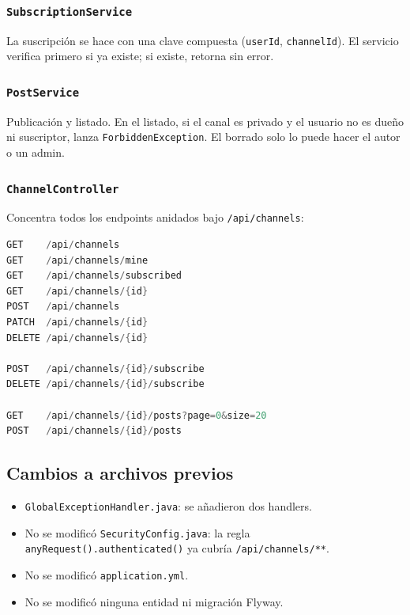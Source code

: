 \subsubsection{\texttt{SubscriptionService}}

La suscripción se hace con una clave compuesta (\texttt{userId}, \texttt{channelId}). El servicio verifica primero si ya existe; si existe, retorna sin error.

\subsubsection{\texttt{PostService}}

Publicación y listado. En el listado, si el canal es privado y el usuario no es dueño ni suscriptor, lanza \texttt{ForbiddenException}. El borrado solo lo puede hacer el autor o un admin.

\subsubsection{\texttt{ChannelController}}

Concentra todos los endpoints anidados bajo \texttt{/api/channels}:

\begin{lstlisting}[language=java]
GET    /api/channels
GET    /api/channels/mine
GET    /api/channels/subscribed
GET    /api/channels/{id}
POST   /api/channels
PATCH  /api/channels/{id}
DELETE /api/channels/{id}

POST   /api/channels/{id}/subscribe
DELETE /api/channels/{id}/subscribe

GET    /api/channels/{id}/posts?page=0&size=20
POST   /api/channels/{id}/posts
\end{lstlisting}

\subsection{Cambios a archivos previos}

\begin{itemize}[leftmargin=*]
  \item \texttt{GlobalExceptionHandler.java}: se añadieron dos handlers.
  \item No se modificó \texttt{SecurityConfig.java}: la regla \texttt{anyRequest().authenticated()} ya cubría \texttt{/api/channels/**}.
  \item No se modificó \texttt{application.yml}.
  \item No se modificó ninguna entidad ni migración Flyway.
\end{itemize}

